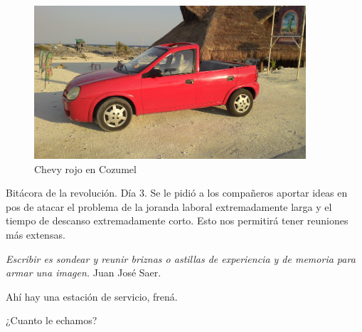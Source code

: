 \documentclass[11pt,twoside,openright,a6paper]{book}
\begin{document}
\begin{figure}[H]
  \centering
    \includegraphics[width=0.9\textwidth]{fotos/2013/auto}
  \caption{Chevy rojo en Cozumel}
  \label{Chevy rojo en Cozumel}
\end{figure}


\vspace{0.5cm}
\hrulefill\hspace{0.2cm} \decofourleft\decofourright \hspace{0.2cm} \hrulefill
\vspace{0.5cm}

Bitácora de la revolución. Día 3. Se le pidió a los compañeros aportar
ideas en pos de atacar el problema de la joranda laboral extremadamente
larga y el tiempo de descanso extremadamente corto. Esto nos permitirá
tener reuniones más extensas.



\vspace{0.5cm}
\hrulefill\hspace{0.2cm} \decofourleft\decofourright \hspace{0.2cm} \hrulefill
\vspace{0.5cm}

 \emph{Escribir es sondear y reunir briznas o
astillas de experiencia y de memoria para armar una imagen.} Juan José Saer.


\vspace{0.5cm}
\hrulefill\hspace{0.2cm} \decofourleft\decofourright \hspace{0.2cm} \hrulefill
\vspace{0.5cm}

Ahí hay una estación de servicio, frená.

¿Cuanto le echamos?
\end{document}
